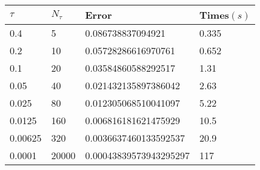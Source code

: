 \begin{tabular}{llll} 
\hline 
$\tau$  & $N_\tau$  &  Error & Times$(s)$  \\ 
\hline \hline 
0.4  & 5 & \num{0.086738837094921} & 0.335 \\ 
0.2  & 10 & \num{0.05728286616970761} & 0.652 \\ 
0.1  & 20 & \num{0.03584860588292517} & 1.31 \\ 
0.05  & 40 & \num{0.021432135897386042} & 2.63 \\ 
0.025  & 80 & \num{0.012305068510041097} & 5.22 \\ 
0.0125  & 160 & \num{0.006816181621475929} & 10.5 \\ 
0.00625  & 320 & \num{0.0036637460133592537} & 20.9 \\ 
0.0001  & 20000 & \num{0.00043839573943295297} & 117 \\ 
\hline 
\end{tabular} 
